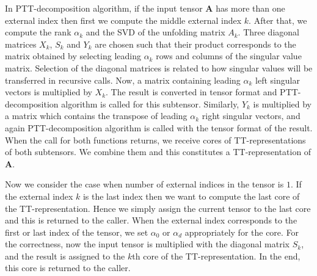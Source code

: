 \documentclass[sigconf]{acmart}
\makeatletter
\newcommand{\tensor}[1]{{\cal\textbf{#1}\xspace}}
\DeclareRobustCommand*\cal{\@fontswitch\relax\mathcal}
\makeatother
\begin{document}
In PTT-decomposition algorithm, if the input tensor \tensor{A} has more than one external index then first we compute the middle external index $k$. After that, we compute the rank $\alpha_k$ and the SVD of the unfolding matrix $A_k$. Three diagonal matrices $X_k$, $S_k$ and $Y_k$ are chosen such that their product corresponds to the matrix obtained by selecting leading $\alpha_k$ rows and columns of the singular value matrix. Selection of the diagonal matrices is related to how singular values will be transferred in recursive calls. Now, a matrix containing leading $\alpha_k$ left singular vectors is multiplied by $X_k$. The result is converted in tensor format and PTT-decomposition algorithm is called for this subtensor. Similarly, $Y_k$ is multiplied by a matrix which contains the transpose of leading $\alpha_k$ right singular vectors, and again PTT-decomposition algorithm is called with the tensor format of the result. When the call for both functions returns, we receive cores of TT-representations of both subtensors. We combine them and this constitutes a TT-representation of \tensor{A}.

Now we consider the case when number of external indices in the tensor is $1$. If the external index $k$ is the last index then we want to compute the last core of the TT-representation. Hence we simply assign the current tensor to the last core and this is returned to the caller. When the external index corresponds to the first or last index of the tensor, we set $\alpha_0$ or $\alpha_d$ appropriately for the core. For the correctness, now the input tensor is multiplied with the diagonal matrix $S_k$, and the result is assigned to the $k$th core of the TT-representation. In the end, this core is returned to the caller. 
\end{document}
